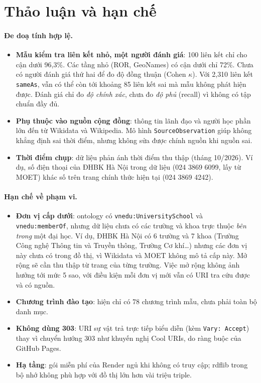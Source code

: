 \documentclass[12pt,a4paper]{article}
\newcommand{\vn}[1]{\texttt{vnedu:\allowbreak #1}}
\begin{document}
\section{Thảo luận và hạn chế}\label{sec:discussion}

\paragraph{Đe doạ tính hợp lệ.}
\begin{itemize}
  \item \textbf{Mẫu kiểm tra liên kết nhỏ, một người đánh giá}: 100 liên kết chỉ cho cận dưới 96,3\%. Các tầng nhỏ
  (ROR, GeoNames) có cận dưới chỉ 72\%. Chưa có người đánh giá thứ hai để đo độ đồng thuận (Cohen \(\kappa\)). Với 2{,}310 liên kết \texttt{sameAs},
  vẫn có thể còn tới khoảng 85 liên kết sai mà mẫu không phát hiện được. Đánh giá chỉ đo \emph{độ chính xác}, chưa đo
  \emph{độ phủ} (recall) vì không có tập chuẩn đầy đủ.
  \item \textbf{Phụ thuộc vào nguồn cộng đồng}: thông tin lãnh đạo và người học phần lớn đến từ Wikidata và Wikipedia.
  Mô hình \texttt{SourceObservation} giúp không khẳng định sai thời điểm, nhưng không sửa được chính nguồn khi nguồn sai.
  \item \textbf{Thời điểm chụp}: dữ liệu phản ánh thời điểm thu thập (tháng 10/2026). Ví dụ, số điện thoại của ĐHBK Hà
  Nội trong dữ liệu (024 3869 6099, lấy từ MOET) khác số trên trang chính thức hiện tại (024 3869 4242).
\end{itemize}

\paragraph{Hạn chế về phạm vi.}
\begin{itemize}
  \item \textbf{Đơn vị cấp dưới}: ontology có \vn{UniversitySchool} và \vn{memberOf}, nhưng dữ liệu chưa có các trường
  và khoa trực thuộc \emph{bên trong} một đại học. Ví dụ, ĐHBK Hà Nội có 6 trường và 7 khoa (Trường Công nghệ Thông tin
  và Truyền thông, Trường Cơ khí\dots) nhưng các đơn vị này chưa có trong đồ thị, vì Wikidata và MOET không mô tả cấp
  này. Mở rộng sẽ cần thu thập từ trang của từng trường. Việc mở rộng không ảnh hưởng tới mức 5 sao, với điều kiện mỗi
  đơn vị mới vẫn có URI tra cứu được và có nguồn.
  \item \textbf{Chương trình đào tạo}: hiện chỉ có 78 chương trình mẫu, chưa phải toàn bộ danh mục.
  \item \textbf{Không dùng 303}: URI sự vật trả trực tiếp biểu diễn (kèm \texttt{Vary: Accept}) thay vì chuyển hướng
  303 như khuyến nghị Cool URIs, do ràng buộc của GitHub Pages.
  \item \textbf{Hạ tầng}: gói miễn phí của Render ngủ khi không có truy cập; rdflib trong bộ nhớ không phù hợp với đồ thị
  lớn hơn vài triệu triple.
\end{itemize}
\end{document}
